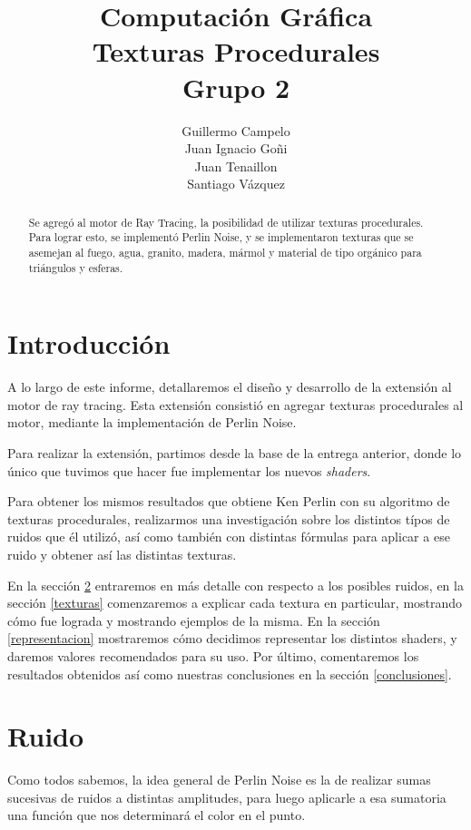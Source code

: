 \documentclass[a4paper,10pt]{article}
\title{Computaci\'on Gr\'afica \\Texturas Procedurales \\Grupo 2}
\author{Guillermo Campelo\\Juan Ignacio Go\~ni\\Juan Tenaillon\\Santiago
V\'azquez}
\begin{document}
\maketitle

\begin{abstract}
Se agregó al motor de Ray Tracing, la posibilidad de utilizar texturas
procedurales.  Para lograr esto, se implementó Perlin Noise, y se implementaron
texturas que se asemejan al fuego, agua, granito, madera, mármol y material de
tipo orgánico para triángulos y esferas.
\end{abstract}

\section{Introducción}

A lo largo de este informe, detallaremos el diseño y desarrollo de la extensión
al motor de ray tracing.  Esta extensión consistió en agregar texturas
procedurales al motor, mediante la implementación de Perlin Noise.

Para realizar la extensión, partimos desde la base de la entrega anterior,
donde lo único que tuvimos que hacer fue implementar los nuevos
\textit{shaders}.

Para obtener los mismos resultados que obtiene Ken Perlin con su algoritmo de
texturas procedurales, realizarmos una investigación sobre los distintos típos
de ruidos que él utilizó, así como también con distintas fórmulas para aplicar
a ese ruido y obtener así las distintas texturas.

En la sección \ref{ruido} entraremos en más detalle con respecto a los posibles
ruidos, en la sección \ref{texturas} comenzaremos a explicar cada textura en
particular, mostrando cómo fue lograda y mostrando ejemplos de la misma.  En la
sección \ref{representacion} mostraremos cómo decidimos representar los
distintos shaders, y daremos valores recomendados para su uso. Por último,
comentaremos los resultados obtenidos así como nuestras conclusiones en la
sección \ref{conclusiones}.

\section{Ruido}
\label{ruido}
Como todos sabemos, la idea general de Perlin Noise es la de realizar sumas
sucesivas de ruidos a distintas amplitudes, para luego aplicarle a esa
sumatoria una función que nos determinará el color en el punto.
\end{document}
